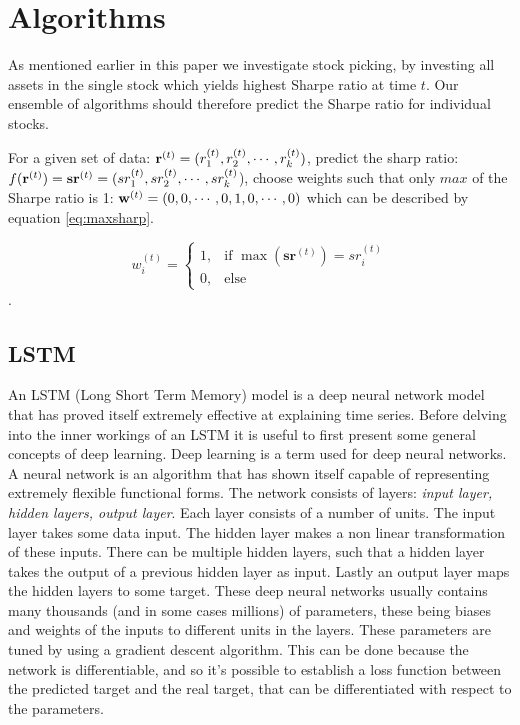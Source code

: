 \section{Algorithms}

As mentioned earlier in this paper we investigate stock picking, by investing all assets in the single stock which yields highest Sharpe ratio at time $t$. Our ensemble of algorithms should therefore predict the Sharpe ratio for individual stocks.

For a given set of data: $\mathbf{r}^{(t)} = (r_1^{(t)}, r_2^{(t)}, \cdots, r_k^{(t)})$, predict the sharp ratio: $f(\mathbf{r}^{(t)}) = \mathbf{sr}^{(t)} = (sr_1^{(t)}, sr_2^{(t)}, \cdots, sr_k^{(t)}$), choose weights such that only $max$ of the Sharpe ratio is 1:
$\mathbf{w}^{(t)} = (0, 0, \cdots,0, 1, 0, \cdots, 0)$ which can be described by equation \ref{eq:maxsharp}.


\begin{equation}\label{eq:maxsharp}
    w_i^{(t)} =
    \begin{cases}
    1, &\text{if } \max({\mathbf{sr}^{(t)}}) = sr_i^{(t)} \\
    0, &\text{else}
    \end{cases}
\end{equation}.

\subsection{LSTM}

An LSTM (Long Short Term Memory) model is a deep neural network model that has proved itself extremely effective at explaining time series. Before delving into the inner workings of an LSTM it is useful to first present some general concepts of deep learning. Deep learning is a term used for deep neural networks. A neural network is an algorithm that has shown itself capable of representing extremely flexible functional forms. The network consists of layers: \textit{input layer, hidden layers, output layer}. Each layer consists of a number of units. The input layer takes some data input. The hidden layer makes a non linear transformation of these inputs. There can be multiple hidden layers, such that a hidden layer takes the output of a previous hidden layer as input. Lastly an output layer maps the hidden layers to some target. These deep neural networks usually contains many thousands (and in some cases millions) of parameters, these being biases and weights of the inputs to different units in the layers. These parameters are tuned by using a gradient descent algorithm. This can be done because the network is differentiable, and so it's possible to establish a loss function between the predicted target and the real target, that can be differentiated with respect to the parameters.

